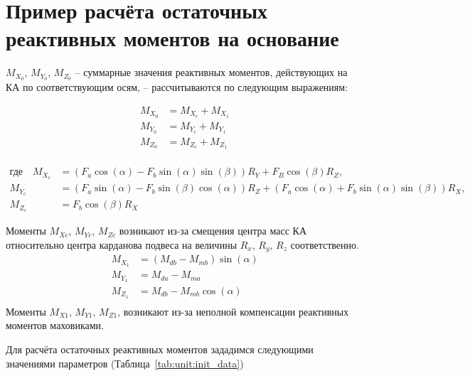 \section{Пример расчёта остаточных реактивных моментов на основание}\label{sec:ch2/sec2}

$M_{X_0}$, $M_{Y_0}$, $M_{Z_0}$ – суммарные значения реактивных моментов, действующих на КА по соответствующим осям, – рассчитываются по следующим выражениям:

\begin{samepage}
	\begin{equation}
		\label{eq:eq_M_sum}
		\begin{aligned}
			M_{X_0}&=M_{X_c}+M_{X_1} \\
			M_{Y_0}&=M_{Y_c}+M_{Y_1} \\
			M_{Z_0}&=M_{Z_c}+M_{Z_1} \\
		\end{aligned}	
	\end{equation}
	
	\begin{align*}
		\text{где} \quad
		M_{X_c} &= \left(F_a \cos(\alpha) - F_b \sin(\alpha) \sin(\beta)\right) R_Y + F_B \cos(\beta) R_Z, \\
		M_{Y_c} &= \left(F_a \sin(\alpha) - F_b \sin(\beta) \cos(\alpha)\right) R_Z + \left(F_a \cos(\alpha) + F_b \sin(\alpha) \sin(\beta)\right) R_X, \\
		M_{Z_c} &= F_b \cos(\beta) R_X
	\end{align*}
\end{samepage}

Моменты $M_{Xc}$, $M_{Yc}$, $M_{Zc}$ возникают из-за смещения центра масс КА относительно центра карданова подвеса на величины $R_x$, $R_y$, $R_z$ соответственно.
\begin{equation}
	\label{eq:eq_M1_proect}
	\begin{aligned}
		M_{X_1}&=(M_{db}-M_{mb})\sin(\alpha) \\
		M_{Y_1}&=M_{da}-M_{ma} \\
		M_{Z_1}&=M_{db}-M_{mb}\cos(\alpha) \\
	\end{aligned}	
\end{equation}
Моменты $M_{X1}$, $M_{Y1}$, $M_{Z1}$, возникают из-за неполной компенсации реактивных моментов маховиками.

Для расчёта остаточных реактивных моментов зададимся следующими значениями параметров (Таблица~\cref{tab:unit:init_data})

